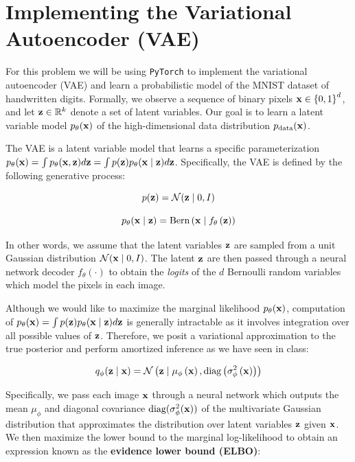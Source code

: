 \section{Implementing the Variational Autoencoder (VAE)} \label{p1}

For this problem we will be using \texttt{PyTorch} to implement the variational autoencoder (VAE) and learn a 
probabilistic model of the MNIST dataset of handwritten digits. Formally, we observe a sequence of binary pixels 
$\mathbf{x} \in {\{0,1\}}^{d}$, and let $\mathbf{z} \in \mathbb{R}^{k}$ denote a set of latent variables. Our goal is to learn a 
latent variable model $p_{\theta}(\mathbf{x})$ of the high-dimensional data distribution $p_{\text{data}}(\mathbf{x})$.

The VAE is a latent variable model that learns a specific parameterization $p_{\theta}(\mathbf{x}) = \int p_{\theta}(\mathbf{x}, \mathbf{z})d\mathbf{z}
= \int p(\mathbf{z})p_{\theta}(\mathbf{x} \mid \mathbf{z})d\mathbf{z}$. Specifically, the VAE is defined by the following generative process:

\begin{equation} \label{eq:1}
    p(\mathbf{z}) = \mathcal{N}(\mathbf{z} \mid 0, I)
\end{equation}

\begin{equation} \label{eq:2}
    p_{\theta}(\mathbf{x} \mid \mathbf{z}) = \text{Bern}\left(\mathbf{x} \mid f_{\theta}\left(\mathbf{z}\right)\right)
\end{equation}

In other words, we assume that the latent variables $\mathbf{z}$ are sampled from a unit Gaussian distribution 
$\mathcal{N}(\mathbf{x} \mid 0,I)$. The latent $\mathbf{z}$ are then passed through a neural network decoder $f_{\theta}(\cdot)$ to obtain the 
\textit{logits} of the $d$ Bernoulli random variables which model the pixels in each image.

Although we would like to maximize the marginal likelihood $p_{\theta}(\mathbf{x})$, computation of $p_{\theta}(\mathbf{x}) =
\int p(\mathbf{z}) p_{\theta}(\mathbf{x} \mid \mathbf{z})d\mathbf{z}$ is generally intractable as it involves integration over all possible values of $\mathbf{z}$. 
Therefore, we posit a variational approximation to the true posterior and perform amortized inference as we have seen in class:

\begin{equation} \label{eq:3}
    q_{\phi}(\mathbf{z} \mid \mathbf{x}) = \mathcal{N}\left(\mathbf{z} \mid \mu_{\phi}\left(\mathbf{x}\right), \text{diag}\left(\sigma_{\phi}^2\left(\mathbf{x}\right)\right)\right)
\end{equation}

Specifically, we pass each image $\mathbf{x}$ through a neural network which outputs the mean $\mu_{\phi}$ and diagonal covariance 
$\text{diag}(\sigma_{\phi}^2(\mathbf{x}))$ of the multivariate Gaussian distribution that approximates the distribution over latent 
variables $\mathbf{z}$ given $\mathbf{x}$. We then maximize the lower bound to the marginal log-likelihood to obtain an expression known as 
the \textbf{evidence lower bound (ELBO)}:

